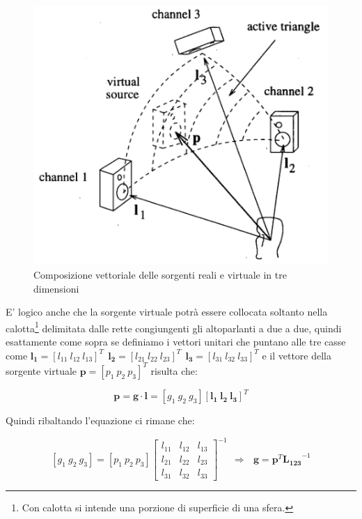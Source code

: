 \documentclass[12pt,a4paper]{report}
\begin{document}
\begin{figure}[htbp]
	\centering
	\includegraphics[scale=0.50]{figures/matrix3d.png}
	\caption {Composizione vettoriale delle sorgenti reali e virtuale in tre dimensioni}
	\label{fig:triangolo}
	\end{figure}

E' logico anche che la sorgente virtuale potrà essere collocata soltanto nella calotta\footnote{Con calotta si intende una porzione di superficie di una sfera.} delimitata dalle rette congiungenti gli altoparlanti a due a due,	 quindi esattamente come sopra se definiamo i vettori unitari che puntano alle tre casse come $ \boldsymbol{l_{1}}= {\left[ l_{11} \ l_{12} \ l_{13} \right]}^T \ \ \boldsymbol{l_{2}}= {\left[ l_{21} \ l_{22} \ l_{23} \right]}^T \ \ \boldsymbol{l_{3}}= {\left[ l_{31} \ l_{32} \ l_{33} \right]}^T$ e il vettore della sorgente virtuale $\boldsymbol{p}= {\left[ p_{1} \ p_{2} \ p_{3} \right]}^T$ risulta che:

\begin{equation}
\boldsymbol{p} = \boldsymbol{g} \cdot \boldsymbol{l} = \left[ g_1 \ g_2 \ g_3 \right] \left[ \boldsymbol{l_{1}} \ \boldsymbol{l_{2}} \ \boldsymbol{l_{3}} \right]^T
\label{gggg}
\end{equation}

Quindi ribaltando l'equazione ci rimane che:

\begin{equation}
\left[g_1 \ g_2 \ g_3 \right] = \left[ p_1 \ p_2 \ p_3 \right]  {\left[\begin{matrix}
l_{11} & l_{12} & l_{13}\\ l_{21} & l_{22} & l_{23} \\ l_{31} & l_{32} & l_{33}
\end{matrix} \right]}^{-1} \ \ \Rightarrow \ \ \ \boldsymbol{g}=\boldsymbol{p}^T {\boldsymbol{L_{123}}}^{-1}
\label{hhhh}
\end{equation}
\end{document}
